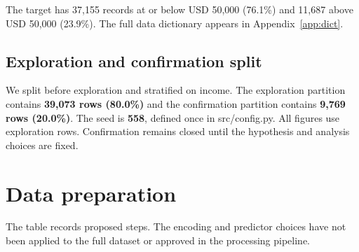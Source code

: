 \documentclass[11pt,a4paper]{article}
\newcommand{\code}[1]{{\small\ttfamily #1}}
\newcommand{\seedvalue}{\textbf{558}}
\begin{document}
The target has 37,155 records at or below USD 50,000 (76.1\%) and 11,687 above
USD 50,000 (23.9\%). The full data dictionary appears in Appendix~\ref{app:dict}.

\subsection{Exploration and confirmation split}

We split before exploration and stratified on \code{income}. The exploration
partition contains \textbf{39,073 rows (80.0\%)} and the confirmation partition
contains \textbf{9,769 rows (20.0\%)}. The seed is \seedvalue, defined once in
\code{src/config.py}. All figures use exploration rows. Confirmation remains
closed until the hypothesis and analysis choices are fixed.

\clearpage
\section{Data preparation}

The table records proposed steps. The encoding and predictor choices have not
been applied to the full dataset or approved in the processing pipeline.
\end{document}
